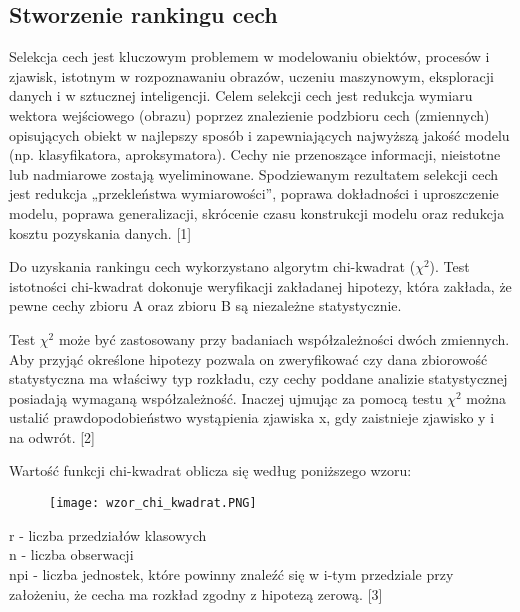 \documentclass{article}
\begin{document}
\subsection{Stworzenie rankingu cech}

\quad Selekcja cech jest kluczowym problemem w modelowaniu obiektów, procesów i zjawisk, istotnym w rozpoznawaniu obrazów, uczeniu maszynowym, eksploracji danych i w sztucznej inteligencji. Celem selekcji cech jest redukcja wymiaru wektora wejściowego (obrazu) poprzez znalezienie podzbioru cech (zmiennych) opisujących obiekt w najlepszy sposób i zapewniających najwyższą jakość modelu (np. klasyfikatora, aproksymatora). Cechy nie przenoszące informacji, nieistotne lub nadmiarowe zostają wyeliminowane. Spodziewanym rezultatem selekcji cech jest redukcja „przekleństwa wymiarowości”, poprawa dokładności i uproszczenie modelu, poprawa generalizacji, skrócenie czasu konstrukcji modelu oraz redukcja kosztu pozyskania danych. [1]

Do uzyskania rankingu cech wykorzystano algorytm chi-kwadrat ($\chi^2$). Test istotności chi-kwadrat dokonuje weryfikacji zakładanej hipotezy, która zakłada, że pewne cechy zbioru A oraz zbioru B są niezależne statystycznie.

Test $\chi^2$ może być zastosowany przy badaniach współzależności dwóch zmiennych. Aby przyjąć określone hipotezy pozwala on zweryfikować czy dana zbiorowość statystyczna ma właściwy typ rozkładu, czy cechy poddane analizie statystycznej posiadają wymaganą współzależność. Inaczej ujmując za pomocą testu $\chi^2$ można ustalić prawdopodobieństwo wystąpienia zjawiska x, gdy zaistnieje zjawisko y i na odwrót. [2]

Wartość funkcji chi-kwadrat oblicza się według poniższego wzoru:
\begin{figure}[ht]
    \centering
    \noindent 
    \vspace{.2cm}
    \texttt{[image: wzor\_chi\_kwadrat.PNG]}
    \label{fig:chi2}
\end{figure}

r - liczba przedziałów klasowych\\
n - liczba obserwacji\\
np{\tiny i} - liczba jednostek, które powinny znaleźć się w i-tym przedziale przy założeniu, że cecha ma rozkład zgodny z hipotezą zerową. [3]\\
\end{document}
